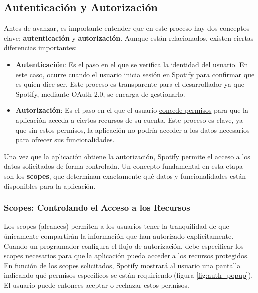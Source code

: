 \subsection{Autenticación y Autorización}

Antes de avanzar, es importante entender que en este proceso hay dos conceptos clave: \textbf{autenticación} y \textbf{autorización}. Aunque están relacionados, existen ciertas diferencias importantes:

\begin{itemize}
    \item \textbf{Autenticación}: Es el paso en el que se \underline{verifica la identidad} del usuario. En este caso, ocurre cuando el usuario inicia sesión en Spotify para confirmar que es quien dice ser. Este proceso es transparente para el desarrollador ya que Spotify, mediante OAuth 2.0, se encarga de gestionarlo.
    \item \textbf{Autorización}: Es el paso en el que el usuario \underline{concede permisos} para que la aplicación acceda a ciertos recursos de su cuenta. Este proceso es clave, ya que sin estos permisos, la aplicación no podría acceder a los datos necesarios para ofrecer sus funcionalidades.
\end{itemize}

Una vez que la aplicación obtiene la autorización, Spotify permite el acceso a los datos solicitados de forma controlada. Un concepto fundamental en esta etapa son los \textbf{scopes}, que determinan exactamente qué datos y funcionalidades están disponibles para la aplicación.

\subsubsection*{Scopes: Controlando el Acceso a los Recursos}

Los scopes (alcances) permiten a los usuarios tener la tranquilidad de que únicamente compartirán la información que han autorizado explícitamente. Cuando un programador configura el flujo de autorización, debe especificar los scopes necesarios para que la aplicación pueda acceder a los recursos protegidos. En función de los scopes solicitados, Spotify mostrará al usuario una pantalla indicando qué permisos específicos se están requiriendo (figura \ref{fig:auth_popup}). El usuario puede entonces aceptar o rechazar estos permisos.

